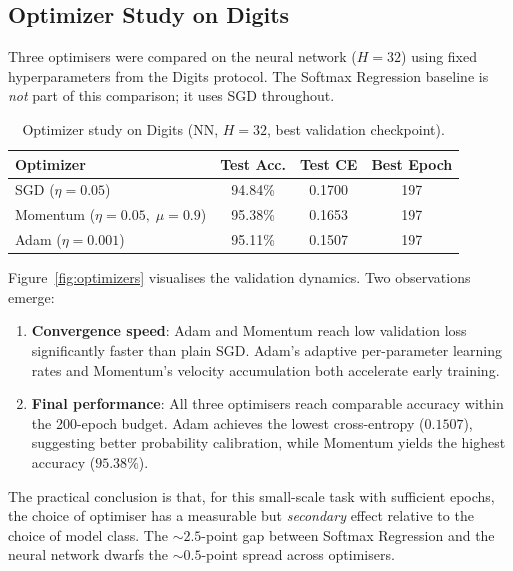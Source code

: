 \documentclass[11pt]{article}
\begin{document}
\subsection{Optimizer Study on Digits}
\label{sec:optimizer}

Three optimisers were compared on the neural network ($H{=}32$) using fixed hyperparameters
from the Digits protocol.  The Softmax Regression baseline is \emph{not} part of this
comparison; it uses SGD throughout.

\begin{table}[H]
\centering
\caption{Optimizer study on Digits (NN, $H{=}32$, best validation checkpoint).}
\label{tab:optimizers}
\begin{tabular}{@{}lccc@{}}
\toprule
\textbf{Optimizer} & \textbf{Test Acc.} & \textbf{Test CE} & \textbf{Best Epoch} \\
\midrule
SGD ($\eta{=}0.05$) & 94.84\% & 0.1700 & 197 \\
Momentum ($\eta{=}0.05,\;\mu{=}0.9$) & 95.38\% & 0.1653 & 197 \\
Adam ($\eta{=}0.001$) & 95.11\% & 0.1507 & 197 \\
\bottomrule
\end{tabular}
\end{table}

Figure~\ref{fig:optimizers} visualises the validation dynamics.  Two observations emerge:
\begin{enumerate}[leftmargin=2em,itemsep=0.15em]
  \item \textbf{Convergence speed}: Adam and Momentum reach low validation loss
        significantly faster than plain SGD.  Adam's adaptive per-parameter learning rates
        and Momentum's velocity accumulation both accelerate early training.
  \item \textbf{Final performance}: All three optimisers reach comparable accuracy within
        the 200-epoch budget.  Adam achieves the lowest cross-entropy ($0.1507$),
        suggesting better probability calibration, while Momentum yields the highest
        accuracy ($95.38\%$).
\end{enumerate}

The practical conclusion is that, for this small-scale task with sufficient epochs, the
choice of optimiser has a measurable but \emph{secondary} effect relative to the choice
of model class.  The ${\sim}2.5$-point gap between Softmax Regression and the neural
network dwarfs the ${\sim}0.5$-point spread across optimisers.
\end{document}
